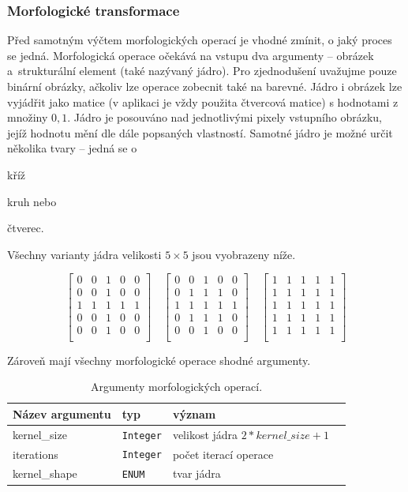 \documentclass[
  field=ainfp,
  master=true,
  biblatex,
  sourcecodes=false,
  theorems=false,
  glossaries,
  index
]{kidiplom}
\begin{document}
\subsubsection*{Morfologické transformace}
Před samotným výčtem morfologických operací je vhodné zmínit, o jaký proces se jedná. Morfologická operace očekává na vstupu dva argumenty -- obrázek a~strukturální element (také nazývaný jádro). Pro zjednodušení uvažujme pouze binární obrázky, ačkoliv lze operace zobecnit také na barevné. Jádro i obrázek lze vyjádřit jako matice (v aplikaci je vždy použita čtvercová matice) s hodnotami z množiny $ {0, 1} $. Jádro je posouváno nad jednotlivými pixely vstupního obrázku, jejíž hodnotu mění dle dále popsaných vlastností. Samotné jádro je možné určit několika tvary -- jedná se o 
\begin{enumerate*}[label={\alph*)}]
\item kříž
\item kruh nebo
\item čtverec.
\end{enumerate*}
Všechny varianty jádra velikosti $5 \times 5$ jsou vyobrazeny níže.

$$
\begin{bmatrix} 
0 & 0 & 1 & 0 & 0 \\
0 & 0 & 1 & 0 & 0 \\
1 & 1 & 1 & 1 & 1 \\
0 & 0 & 1 & 0 & 0 \\
0 & 0 & 1 & 0 & 0 \\
\end{bmatrix}
\quad
\begin{bmatrix} 
0 & 0 & 1 & 0 & 0 \\
0 & 1 & 1 & 1 & 0 \\
1 & 1 & 1 & 1 & 1 \\
0 & 1 & 1 & 1 & 0 \\
0 & 0 & 1 & 0 & 0 \\
\end{bmatrix}
\quad
\begin{bmatrix} 
1 & 1 & 1 & 1 & 1 \\
1 & 1 & 1 & 1 & 1 \\
1 & 1 & 1 & 1 & 1 \\
1 & 1 & 1 & 1 & 1 \\
1 & 1 & 1 & 1 & 1 \\
\end{bmatrix}
$$

Zároveň mají všechny morfologické operace shodné argumenty.


\begin{table}[H]
\centering
\begin{tabular}{|l|l|l|l|}
\hline
\textbf{Název argumentu} & \textbf{typ} & \textbf{význam}
\\ \hline
kernel\_size & \texttt{Integer} & velikost jádra $2 * kernel\_size + 1$
\\ \hline
iterations & \texttt{Integer} & počet iterací operace
\\ \hline
kernel\_shape & \texttt{ENUM}  & tvar jádra
\\ \hline
\end{tabular}
\caption{Argumenty morfologických operací.}
\end{table}
\end{document}
